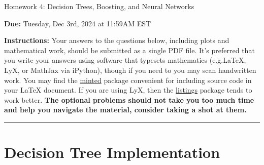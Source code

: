 \documentclass{article}
\newcommand{\ruleskip}{\bigskip\hrule\bigskip}
\theoremstyle{plain}
\theoremstyle{definition}
\begin{document}

\pagestyle{myheadings} 

\begin{center}
{\Large
Homework 4: Decision Trees, Boosting, and Neural Networks
} 
\end{center}

{
{ \color{nyupurple} \textbf{Due:} Tuesday, Dec 3rd, 2024 at 11:59AM EST} 
} 

\textbf{Instructions: }Your answers to the questions below, including plots and mathematical work, should be submitted as a single PDF file.  It's preferred that you write your answers using software that typesets mathematics (e.g.LaTeX, LyX, or MathJax via iPython), though if you need to you may scan handwritten work.  You may find the \href{https://github.com/gpoore/minted}{minted} package convenient for including source code in your LaTeX document.  If you are using LyX, then the \href{https://en.wikibooks.org/wiki/LaTeX/Source_Code_Listings}{listings} package tends to work better. {\bf The optional problems should not take you too much time and help you navigate the material, consider taking a shot at them.}

\ruleskip




\section{Decision Tree Implementation}
\end{document}
